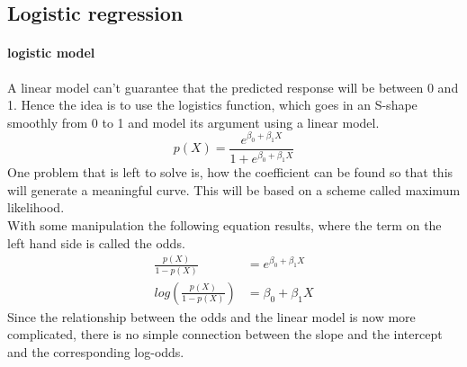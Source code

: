 \documentclass[../document.tex]{subfiles}
\begin{document}
	\subsection{Logistic regression}

	\paragraph{logistic model}
	A linear model can't guarantee that the predicted response will be between 0 and 1. Hence the idea is to use the logistics function, which goes in an S-shape smoothly from 0 to 1 and model its argument using a linear model.
	\begin{equation}
		p(X)=\frac{e^{\beta_{0}+\beta_{1}X}}{1+e^{\beta_{0}+\beta_{1}X}}
	\end{equation}
	One problem that is left to solve is, how the coefficient can be found so that this will generate a meaningful curve. This will be based on a scheme called maximum likelihood.\\
	With some manipulation the following equation results, where the term on the left hand side is called the odds.
	\begin{equation}
	\begin{split}
		\frac{p(X)}{1-p(X)}&=e^{\beta_{0}+\beta_{1}X}\\
		log(\frac{p(X)}{1-p(X)})&=\beta_{0}+\beta_{1}X
	\end{split}
	\end{equation}
	Since the relationship between the odds and the linear model is now more complicated, there is no simple connection between the slope and the intercept and the corresponding log-odds.
\end{document}
